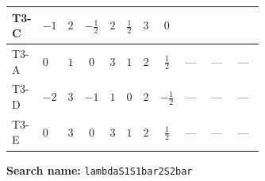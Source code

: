 \documentclass[8pt]{article}
\begin{document}
\begin{landscape}
\begin{longtable}{@{}llcccccc >{\raggedright\arraybackslash}p{0.21\linewidth} >{\raggedright\arraybackslash}p{0.21\linewidth} >{\raggedright\arraybackslash}p{0.21\linewidth}@{}}
\midrule
T3-C & $-1$ & $2$ & $-\frac{1}{2}$ & $2$ & $\frac{1}{2}$ & $3$ & $0$ & \scriptsize\adjustbox{max width=\linewidth}{$\begin{gathered} +{\lambda_{12}} (6 {\lambda_{S_1^\dagger S_2 S_2^{\dagger 2}}}+6 {\lambda_{S_1 S_1^{\dagger 2}S_2^\dagger}})\end{gathered}$} & \scriptsize\adjustbox{max width=\linewidth}{$\begin{gathered} +{\lambda_{12}^{\rm Adj}} \left(\frac{{\lambda_{S_1^\dagger S_2 S_2^{\dagger 2}}}}{6}+\frac{5 {\lambda_{S_1 S_1^{\dagger 2}S_2^\dagger}}}{6}\right)\end{gathered}$} & \scriptsize\adjustbox{max width=\linewidth}{$\begin{gathered} +2 {\lambda_{H1}} {\lambda_{H H^\dagger S_1^\dagger S_2^\dagger}^{\rm Cross}}\end{gathered}$} \\
\midrule
T3-A & $0$ & $1$ & $0$ & $3$ & $1$ & $2$ & $\frac{1}{2}$ & --- & --- & --- \\
\midrule
T3-D & $-2$ & $3$ & $-1$ & $1$ & $0$ & $2$ & $-\frac{1}{2}$ & --- & --- & --- \\
\midrule
T3-E & $0$ & $3$ & $0$ & $3$ & $1$ & $2$ & $\frac{1}{2}$ & --- & --- & --- \\
\midrule
\bottomrule
\end{longtable}
\clearpage
\noindent\textbf{Search name: }\texttt{lambdaS1S1bar2S2bar}\par\smallskip

\end{landscape}
\end{document}
